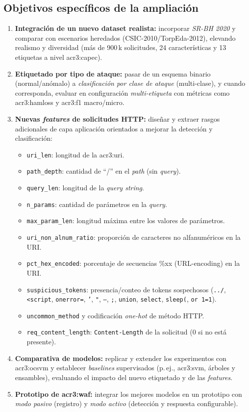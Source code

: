 \subsection*{Objetivos específicos de la ampliación}
\begin{enumerate}
  \item \textbf{Integración de un nuevo dataset realista:} incorporar \textit{SR-BH 2020} \cite{harvard2020dataset} y comparar con escenarios heredados (CSIC-2010/TorpEda-2012), elevando realismo y diversidad (más de 900\,k solicitudes, 24 características y 13 etiquetas a nivel \gls{acr3:capec}).
  \item \textbf{Etiquetado por tipo de ataque:} pasar de un esquema binario (normal/anómalo) a \emph{clasificación por clase de ataque} (multi-clase), y cuando corresponda, evaluar en configuración \emph{multi-etiqueta} con métricas como \gls{acr3:hamloss} y \gls{acr3:f1} macro/micro.
  \item \textbf{Nuevas \textit{features} de solicitudes HTTP:} diseñar y extraer rasgos adicionales de capa aplicación orientados a mejorar la detección y clasificación:
  \begin{itemize}
    \item \texttt{uri\_len}: longitud de la \gls{acr3:uri}.
    \item \texttt{path\_depth}: cantidad de “/” en el \textit{path} (sin \textit{query}).
    \item \texttt{query\_len}: longitud de la \textit{query string}.
    \item \texttt{n\_params}: cantidad de parámetros en la \textit{query}.
    \item \texttt{max\_param\_len}: longitud máxima entre los valores de parámetros.
    \item \texttt{uri\_non\_alnum\_ratio}: proporción de caracteres no alfanuméricos en la URI.
    \item \texttt{pct\_hex\_encoded}: porcentaje de secuencias \%xx (URL-encoding) en la URI.
    \item \texttt{suspicious\_tokens}: presencia/conteo de tokens sospechosos (\texttt{../}, \texttt{<script}, \texttt{onerror=}, \texttt{'}, \texttt{"}, \texttt{--}, \texttt{;}, \texttt{union}, \texttt{select}, \texttt{sleep(}, \texttt{or 1=1}).
    \item \texttt{uncommon\_method} y codificación \textit{one-hot} de método HTTP.
    \item \texttt{req\_content\_length}: \texttt{Content-Length} de la solicitud (0 si no está presente).
  \end{itemize}
  \item \textbf{Comparativa de modelos:} replicar y extender los experimentos con \gls{acr3:ocsvm} y establecer \textit{baselines} supervisados (p.\,ej., \gls{acr3:svm}, árboles y ensambles), evaluando el impacto del nuevo etiquetado y de las \textit{features}.
  \item \textbf{Prototipo de \gls{acr3:waf}:} integrar los mejores modelos en un prototipo con \emph{modo pasivo} (registro) y \emph{modo activo} (detección y respuesta configurable).
\end{enumerate}

